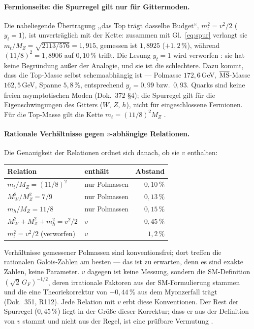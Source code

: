 \paragraph{Fermionseite: die Spurregel gilt nur für Gittermoden.}
Die naheliegende Übertragung ,,das Top trägt dasselbe Budget``,
$m_t^2 = v^2/2$ ($y_t = 1$), ist unverträglich mit der Kette: zusammen mit
Gl.~\eqref{eq:spur} verlangt sie $m_t/M_Z = \sqrt{2113/576} = 1{,}915$,
gemessen ist $1{,}8925$ ($+1{,}2\,\%$), während $(11/8)^2 = 1{,}8906$ auf
$0{,}10\,\%$ trifft. Die Lesung $y_t = 1$ wird verworfen \XM: sie hat keine
Begründung außer der Analogie, und sie ist die schlechtere. Dazu kommt, dass
die Top-Masse selbst schemaabhängig ist --- Polmasse $172{,}6$\,GeV,
$\overline{\rm MS}$-Masse $162{,}5$\,GeV, Spanne $5{,}8\,\%$, entsprechend
$y_t = 0{,}99$ bzw.\ $0{,}93$. Quarks sind keine freien asymptotischen Moden
(Dok.~372 §4); die Spurregel gilt für die Eigenschwingungen des Gitters
($W$, $Z$, $h$), nicht für eingeschlossene Fermionen. Für die Top-Masse gilt
die Kette $m_t = (11/8)^2M_Z$ \KM.

\paragraph{Rationale Verhältnisse gegen $v$-abhängige Relationen.}
Die Genauigkeit der Relationen ordnet sich danach, ob sie $v$ enthalten:
\begin{center}
\small\begin{tabular}{@{}llr@{}}
\toprule
Relation & enthält & Abstand \\
\midrule
$m_t/M_Z = (11/8)^2$ & nur Polmassen & $0{,}10\,\%$ \\
$M_W^2/M_Z^2 = 7/9$ & nur Polmassen & $0{,}13\,\%$ \\
$m_h/M_Z = 11/8$ & nur Polmassen & $0{,}15\,\%$ \\
$M_W^2+M_Z^2+m_h^2 = v^2/2$ & $v$ & $0{,}45\,\%$ \\
$m_t^2 = v^2/2$ (verworfen) & $v$ & $1{,}2\,\%$ \\
\bottomrule
\end{tabular}
\end{center}
Verhältnisse gemessener Polmassen sind konventionsfrei; dort treffen die
rationalen Galois-Zahlen am besten --- das ist zu erwarten, denn es sind
exakte Zahlen, keine Parameter. $v$ dagegen ist keine Messung, sondern die
SM-Definition $(\sqrt2\,G_F)^{-1/2}$, deren irrationale Faktoren aus der
SM-Formulierung stammen und die eine Theoriekorrektur von $-0{,}44\,\%$ aus
dem Myonzerfall trägt (Dok.~351, R112). Jede Relation mit $v$ erbt diese
Konventionen. Der Rest der Spurregel ($0{,}45\,\%$) liegt in der Größe
dieser Korrektur; dass er aus der Definition von $v$ stammt und nicht aus
der Regel, ist eine prüfbare Vermutung \SM.

